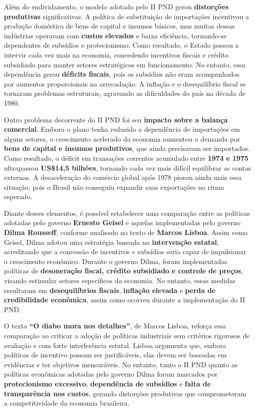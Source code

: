 \documentclass[a4paper,12pt]{article}[abntex2]
\begin{document}
Além do endividamento, o modelo adotado pelo II PND gerou \textbf{distorções produtivas} significativas. A política de substituição de importações incentivou a produção doméstica de bens de capital e insumos básicos, mas muitas dessas indústrias operavam com \textbf{custos elevados} e baixa eficiência, tornando-se dependentes de subsídios e protecionismo. Como resultado, o Estado passou a intervir cada vez mais na economia, concedendo incentivos fiscais e crédito subsidiado para manter setores estratégicos em funcionamento. No entanto, essa dependência gerou \textbf{déficits fiscais}, pois os subsídios não eram acompanhados por aumentos proporcionais na arrecadação. A inflação e o desequilíbrio fiscal se tornaram problemas estruturais, agravando as dificuldades do país na década de 1980.

Outro problema decorrente do II PND foi seu \textbf{impacto sobre a balança comercial}. Embora o plano tenha reduzido a dependência de importações em alguns setores, o crescimento acelerado da economia aumentou a demanda por \textbf{bens de capital e insumos produtivos}, que ainda precisavam ser importados. Como resultado, o déficit em transações correntes acumulado entre \textbf{1974 e 1975} ultrapassou \textbf{US\$14,5 bilhões}, tornando cada vez mais difícil equilibrar as contas externas. A desaceleração do comércio global após 1978 piorou ainda mais essa situação, pois o Brasil não conseguiu expandir suas exportações no ritmo esperado.

Diante desses elementos, é possível estabelecer uma comparação entre as políticas adotadas pelo governo \textbf{Ernesto Geisel} e aquelas implementadas pelo governo \textbf{Dilma Rousseff}, conforme analisado no texto de \textbf{Marcos Lisboa}. Assim como Geisel, Dilma adotou uma estratégia baseada na \textbf{intervenção estatal}, acreditando que a concessão de incentivos e subsídios seria capaz de impulsionar o crescimento econômico. Durante o governo Dilma, foram implementadas políticas de \textbf{desoneração fiscal, crédito subsidiado e controle de preços}, visando estimular setores específicos da economia. No entanto, essas medidas resultaram em \textbf{desequilíbrios fiscais}, \textbf{inflação elevada} e \textbf{perda de credibilidade econômica}, assim como ocorreu durante a implementação do II PND.

O texto \textbf{“O diabo mora nos detalhes”}, de Marcos Lisboa, reforça essa comparação ao criticar a adoção de políticas industriais sem critérios rigorosos de avaliação e com forte interferência estatal. Lisboa argumenta que, embora políticas de incentivo possam ser justificáveis, elas devem ser baseadas em evidências e ter objetivos mensuráveis. No entanto, tanto o II PND quanto as políticas econômicas adotadas pelo governo Dilma foram marcados por \textbf{protecionismo excessivo}, \textbf{dependência de subsídios} e \textbf{falta de transparência nos custos}, gerando distorções produtivas que comprometeram a competitividade da economia brasileira.
\end{document}
